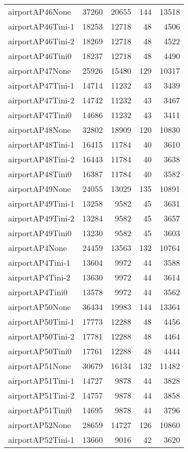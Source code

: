\begin{longtable}{lrrrr}
airportAP46None & 37260 & 20655 & 144 & 13518 \\
airportAP46Tini-1 & 18253 & 12718 & 48 & 4506 \\
airportAP46Tini-2 & 18269 & 12718 & 48 & 4522 \\
airportAP46Tini0 & 18237 & 12718 & 48 & 4490 \\
airportAP47None & 25926 & 15480 & 129 & 10317 \\
airportAP47Tini-1 & 14714 & 11232 & 43 & 3439 \\
airportAP47Tini-2 & 14742 & 11232 & 43 & 3467 \\
airportAP47Tini0 & 14686 & 11232 & 43 & 3411 \\
airportAP48None & 32802 & 18909 & 120 & 10830 \\
airportAP48Tini-1 & 16415 & 11784 & 40 & 3610 \\
airportAP48Tini-2 & 16443 & 11784 & 40 & 3638 \\
airportAP48Tini0 & 16387 & 11784 & 40 & 3582 \\
airportAP49None & 24055 & 13029 & 135 & 10891 \\
airportAP49Tini-1 & 13258 & 9582 & 45 & 3631 \\
airportAP49Tini-2 & 13284 & 9582 & 45 & 3657 \\
airportAP49Tini0 & 13230 & 9582 & 45 & 3603 \\
airportAP4None & 24459 & 13563 & 132 & 10764 \\
airportAP4Tini-1 & 13604 & 9972 & 44 & 3588 \\
airportAP4Tini-2 & 13630 & 9972 & 44 & 3614 \\
airportAP4Tini0 & 13578 & 9972 & 44 & 3562 \\
airportAP50None & 36434 & 19983 & 144 & 13364 \\
airportAP50Tini-1 & 17773 & 12288 & 48 & 4456 \\
airportAP50Tini-2 & 17781 & 12288 & 48 & 4464 \\
airportAP50Tini0 & 17761 & 12288 & 48 & 4444 \\
airportAP51None & 30679 & 16134 & 132 & 11482 \\
airportAP51Tini-1 & 14727 & 9878 & 44 & 3828 \\
airportAP51Tini-2 & 14757 & 9878 & 44 & 3858 \\
airportAP51Tini0 & 14695 & 9878 & 44 & 3796 \\
airportAP52None & 28659 & 14727 & 126 & 10860 \\
airportAP52Tini-1 & 13660 & 9016 & 42 & 3620 \\

\end{longtable}
